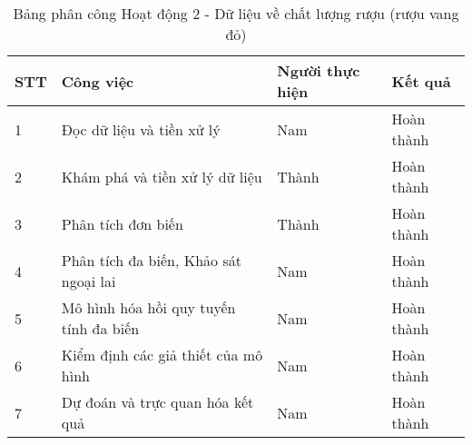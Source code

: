 \begin{table}[H]
    \centering 
    \caption{Bảng phân công Hoạt động 2 - Dữ liệu về chất lượng rượu (rượu vang đỏ)}
    \label{tab:phancong3}
    \begin{tabular}{|l|l|l|l|}
    \hline
    STT & Công việc                                                   & Người thực hiện & Kết quả    \\ \hline
    1   & Đọc dữ liệu và tiền xử lý                                   & Nam             & Hoàn thành \\ \hline
    2   & Khám phá và tiền xử lý dữ liệu                              & Thành           & Hoàn thành \\ \hline
    3   & Phân tích đơn biến                                          & Thành           & Hoàn thành \\ \hline
    4   & Phân tích đa biến, Khảo sát ngoại lai                       & Nam             & Hoàn thành \\ \hline
    5   & Mô hình hóa hồi quy tuyến tính đa biến                         & Nam           & Hoàn thành \\ \hline
    6   & Kiểm định các giả thiết của mô hình                        & Nam           & Hoàn thành \\ \hline
    7  & Dự đoán và trực quan hóa kết quả                            & Nam             & Hoàn thành \\ \hline
    \end{tabular}
\end{table}


